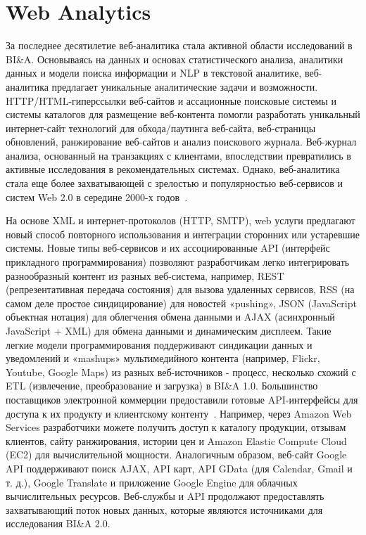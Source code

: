 \section{Web Analytics}

За последнее десятилетие веб-аналитика стала активной
области исследований в BI\&A. Основываясь на данных
и основах статистического анализа, аналитики данных и
модели поиска информации и NLP в текстовой аналитике,
веб-аналитика предлагает уникальные аналитические задачи и
возможности. HTTP/HTML-гиперссылки веб-сайтов и
ассационные поисковые системы и системы каталогов для
размещение веб-контента помогли разработать уникальный интернет-сайт технологий для обхода/паутинга веб-сайта, веб-страницы обновлений, ранжирование веб-сайтов и анализ поискового журнала. Веб-журнал
анализа, основанный на транзакциях с клиентами, впоследствии
превратились в активные исследования в рекомендательных системах. Однако,
веб-аналитика стала еще более захватывающей с
зрелостью и популярностью веб-сервисов и систем Web 2.0
в середине 2000-х годов~\cite{OReilly:2005}.

На основе XML и интернет-протоколов (HTTP, SMTP), web
услуги предлагают новый способ повторного использования и интеграции сторонних
или устаревшие системы. Новые типы веб-сервисов и их
ассоциированные API (интерфейс прикладного программирования) позволяют
разработчикам легко интегрировать разнообразный контент из разных
веб-система, например, REST (репрезентативная
передача состояния) для вызова удаленных сервисов, RSS (на самом деле
простое синдицирование) для новостей «pushing», JSON (JavaScript
объектная нотация) для облегчения обмена данными и AJAX
(асинхронный JavaScript + XML) для обмена данными и
динамическим дисплеем. Такие легкие модели программирования
поддерживают синдикации данных и уведомлений и «mashups»
мультимедийного контента (например, Flickr, Youtube, Google Maps)
из разных веб-источников - процесс, несколько схожий с
ETL (извлечение, преобразование и загрузка) в BI\&A 1.0.
Большинство поставщиков электронной коммерции предоставили готовые API-интерфейсы
для доступа к их продукту и клиентскому контенту~\cite{Schonfeld:2005}. Например, через Amazon Web Services разработчики
можете получить доступ к каталогу продукции, отзывам клиентов, сайту
ранжирования, истории цен и Amazon Elastic Compute
Cloud (EC2) для вычислительной мощности. Аналогичным образом, веб-сайт Google
API поддерживают поиск AJAX, API карт, API GData (для
Calendar, Gmail и т. д.), Google Translate и приложение Google
Engine для облачных вычислительных ресурсов. Веб-службы и
API продолжают предоставлять захватывающий поток новых данных, которые являются
источниками для исследования BI\&A 2.0.

